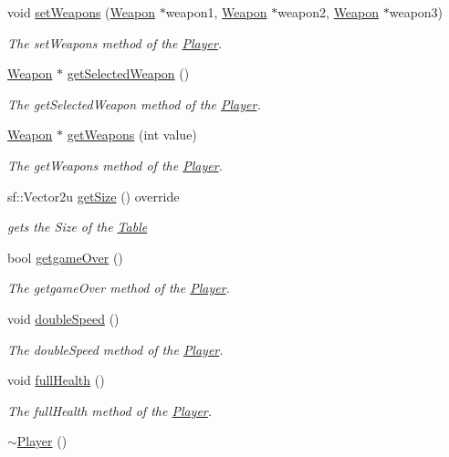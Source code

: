 \begin{DoxyCompactItemize}
void \hyperlink{class_player_a0fca3ee9cea38e8944663f19a0cdb27b}{set\+Weapons} (\hyperlink{class_weapon}{Weapon} $\ast$weapon1, \hyperlink{class_weapon}{Weapon} $\ast$weapon2, \hyperlink{class_weapon}{Weapon} $\ast$weapon3)
\begin{DoxyCompactList}\small\item\em The set\+Weapons method of the \hyperlink{class_player}{Player}. \end{DoxyCompactList}\item 
\hyperlink{class_weapon}{Weapon} $\ast$ \hyperlink{class_player_ab087a0124f92c63e91cc846db9b82b76}{get\+Selected\+Weapon} ()
\begin{DoxyCompactList}\small\item\em The get\+Selected\+Weapon method of the \hyperlink{class_player}{Player}. \end{DoxyCompactList}\item 
\hyperlink{class_weapon}{Weapon} $\ast$ \hyperlink{class_player_af442b7ed41244bba619d1a2ef8812123}{get\+Weapons} (int value)
\begin{DoxyCompactList}\small\item\em The get\+Weapons method of the \hyperlink{class_player}{Player}. \end{DoxyCompactList}\item 
sf\+::\+Vector2u \hyperlink{class_player_a9b815bbbc9cb8332549acc10d03c7c0b}{get\+Size} () override
\begin{DoxyCompactList}\small\item\em gets the Size of the \hyperlink{class_table}{Table} \end{DoxyCompactList}\item 
bool \hyperlink{class_player_a1d3d8988bfe2487e1ef7d82502171c8e}{getgame\+Over} ()
\begin{DoxyCompactList}\small\item\em The getgame\+Over method of the \hyperlink{class_player}{Player}. \end{DoxyCompactList}\item 
void \hyperlink{class_player_a8e4910c81921d28b35878db4395b1f47}{double\+Speed} ()
\begin{DoxyCompactList}\small\item\em The double\+Speed method of the \hyperlink{class_player}{Player}. \end{DoxyCompactList}\item 
void \hyperlink{class_player_a807069673b66d211110c018998456d3e}{full\+Health} ()
\begin{DoxyCompactList}\small\item\em The full\+Health method of the \hyperlink{class_player}{Player}. \end{DoxyCompactList}\item 
\hypertarget{class_player_a749d2c00e1fe0f5c2746f7505a58c062}{\hyperlink{class_player_a749d2c00e1fe0f5c2746f7505a58c062}{$\sim$\+Player} ()}\label{class_player_a749d2c00e1fe0f5c2746f7505a58c062}


\end{DoxyCompactItemize}

